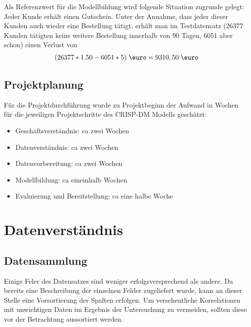 \documentclass[a4paper,12pt]{article}
\begin{document}
Als Referenzwert\label{Referenzwerte} für die Modellbildung wird folgende Situation
zugrunde gelegt: Jeder Kunde erhält einen Gutschein. Unter der Annahme, dass jeder dieser Kunden auch wieder eine Bestellung tätigt, erhält man im Testdatensatz (26377 Kunden tätigten keine weitere Bestellung innerhalb von 90 Tagen, 6051 aber schon) einen Verlust von
\begin{align}
(26377 *1.50 - 6051*5)\;\text{\euro} = 9310,50\;\text{\euro}\label{gl1}
\end{align}

\subsection{Projektplanung}
Für die Projektdurchführung wurde zu Projektbeginn der Aufwand in
Wochen für die jeweiligen Projektschritte des CRISP-DM Modells geschätzt:
\begin{itemize}
	\item Geschäftsverständnis: ca zwei Wochen
	\item Datenverständnis: ca zwei Wochen
	\item Datenvorbereitung: ca zwei Wochen
	\item Modellbildung: ca eineinhalb Wochen
	\item Evaluierung und Bereitstellung: ca eine halbe Woche
\end{itemize}

\section{Datenverständnis}
\subsection{Datensammlung}
Einige Feler des Datensatzes sind weniger erfolgsversprechend als andere. Da bereits eine
Beschreibung der einzelnen Felder zugeliefert wurde, kann an dieser Stelle eine Vorsortierung
der Spalten erfolgen. Um versehentliche Korrelationen mit unwichtigen Daten im Ergebnis der
Untersuchung zu vermeiden, sollten diese vor der Betrachtung aussortiert werden.
\end{document}
